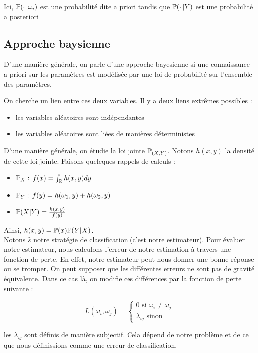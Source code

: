 Ici, $\P(\cdot \, \vert \omega_i)$ est une probabilité dite \og a priori \fg{} tandis que $\P( \cdot \, \vert Y)$ est une probabilité \og a posteriori \fg{}

\subsection{Approche baysienne}

D'une manière générale, on parle d'une approche \og bayesienne \fg{} si une connaissance \og a priori \fg{} sur les paramètres est modélisée par une loi de probabilité sur l'ensemble des paramètres.

On cherche un lien entre ces deux variables. Il y a deux liens \og extrêmes possibles \fg{} :
\begin{itemize}
\item les variables aléatoires sont indépendantes
  \item les variables aléatoires sont liées de manières déterministes
\end{itemize}

D'une manière générale, on étudie la loi jointe $\P_{(X,Y)}$. Notons $h(x,y)$ la densité de cette loi jointe. Faisons queleques rappels de calculs :  
\begin{itemize}
  \item $\P_X : \, f(x) = \int_{\R} h(x,y) dy$
  \item $\P_Y : \, f(y) = h(\omega_1, y) + h(\omega_2, y)$
  \item $\P(X\vert Y) = \frac{h(x,y)}{f(y)}$
\end{itemize}

Ainsi, $h(x,y) = \P(x)\P(Y\vert X)$. \\

Notons $\widehat{s}$ notre stratégie de classification (c'est notre estimateur). Pour évaluer notre estimateur, nous calculons l'erreur de notre estimation à travers une fonction de perte. En effet, notre estimateur peut nous donner une bonne réponse ou se tromper. On peut supposer que les différentes erreurs ne sont pas de gravité équivalente. Dans ce cas là, on modifie ces différences par la fonction de perte suivante :

\[
  L(\omega_i, \omega_j) = \begin{cases}
    0 \text{ si } \omega_i \neq \omega_j \\
    \lambda_{ij} \text{ sinon}
  \end{cases}
\]

\Rq les $\lambda_{ij}$ sont définis de manière subjectif. Cela dépend de notre problème et de ce que nous définissions comme une erreur de classification.

